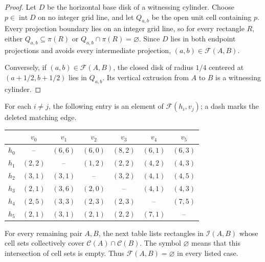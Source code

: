 \documentclass[11pt]{amsart}
\begin{document}
\begin{proof}
Let $D$ be the horizontal base disk of a witnessing cylinder.  Choose
$p\in\operatorname{int}D$ on no integer grid line, and let $Q_{a,b}$ be the
open unit cell containing $p$.  Every projection boundary lies on an integer
grid line, so for every rectangle $R$, either
$Q_{a,b}\subseteq\pi(R)$ or
$Q_{a,b}\cap\pi(R)=\varnothing$.  Since $D$ lies in both endpoint projections
and avoids every intermediate projection,
$(a,b)\in\mathcal F(A,B)$.

Conversely, if $(a,b)\in\mathcal F(A,B)$, the closed disk of radius $1/4$
centered at $(a+1/2,b+1/2)$ lies in $Q_{a,b}$.  Its vertical extrusion from
$A$ to $B$ is a witnessing cylinder.
\end{proof}

For each $i\ne j$, the following entry is an element of
$\mathcal F(h_i,v_j)$; a dash marks the deleted matching edge.

\begin{center}
\small
\renewcommand{\arraystretch}{1.15}
\begin{tabular}{@{}c|cccccc@{}}
 & $v_0$ & $v_1$ & $v_2$ & $v_3$ & $v_4$ & $v_5$ \\
\hline
$h_0$ & --      & $(6,6)$ & $(6,0)$ & $(8,2)$ & $(6,1)$ & $(6,3)$ \\
$h_1$ & $(2,2)$ & --      & $(1,2)$ & $(2,2)$ & $(4,2)$ & $(4,3)$ \\
$h_2$ & $(3,1)$ & $(3,1)$ & --      & $(3,2)$ & $(4,1)$ & $(4,5)$ \\
$h_3$ & $(2,1)$ & $(3,6)$ & $(2,0)$ & --      & $(4,1)$ & $(4,3)$ \\
$h_4$ & $(2,5)$ & $(3,3)$ & $(2,3)$ & $(2,3)$ & --      & $(7,5)$ \\
$h_5$ & $(2,1)$ & $(3,1)$ & $(2,1)$ & $(2,2)$ & $(7,1)$ & --      \\
\end{tabular}
\end{center}

For every remaining pair $A,B$, the next table lists rectangles in
$\mathcal I(A,B)$ whose cell sets collectively cover
$\mathcal C(A)\cap\mathcal C(B)$.  The symbol $\varnothing$ means that this
intersection of cell sets is empty.  Thus $\mathcal F(A,B)=\varnothing$ in
every listed case.
\end{document}
